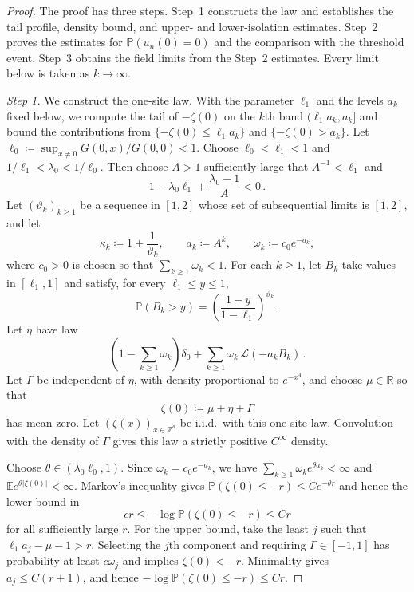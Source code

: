 \documentclass[11pt]{amsart}
\theoremstyle{plain}
\theoremstyle{definition}
\newcommand{\Z}{\mathbb{Z}}
\newcommand{\R}{\mathbb{R}}
\newcommand{\E}{\mathbb{E}}
\renewcommand{\P}{\mathbb{P}}
\begin{document}
\begin{proof}
	The proof has three steps. Step~1 constructs the law and establishes the tail profile,
	density bound, and upper- and lower-isolation estimates. Step~2 proves the estimates
	for $\P(u_n(0)=0)$ and the comparison with the threshold event. Step~3 obtains the field limits from the Step~2
	estimates. Every limit below is taken as $k\to\infty$.

	\par\smallskip\noindent\emph{Step 1.} We construct the one-site law. With the parameter
	$\ell_{1}$ and the levels $a_k$ fixed below, we compute the tail of $-\zeta(0)$ on the $k$th
	band $(\ell_{1} a_k,a_k]$ and bound the contributions from $\{-\zeta(0)\leq\ell_{1} a_k\}$ and
	$\{-\zeta(0)>a_k\}$.
	Let
	$\ell_{0}\coloneqq\sup_{x\ne0}G(0,x)/G(0,0)<1$.
	Choose $\ell_{0}<\ell_{1}<1$ and
	$1/\ell_{1}<\lambda_{0}<1/\ell_{0}$. Then choose $A>1$ sufficiently large that
	$A^{-1}<\ell_{1}$ and
	\begin{equation}\label{eq:dgt4-band-parameters}
		1-\lambda_{0}\ell_{1}+\frac{\lambda_{0}-1}{A}<0\, .
	\end{equation}
	Let $(\vartheta_k)_{k\geq1}$ be a sequence in $[1,2]$ whose set of
	subsequential limits is $[1,2]$, and let
	\[
		\kappa_k\coloneqq1+\frac1{\vartheta_k},
		\qquad
		a_k\coloneqq A^k,
		\qquad
		\omega_k\coloneqq c_{0}e^{-a_k},
	\]
	where $c_{0}>0$ is chosen so that $\sum_{k\geq1}\omega_k<1$.
	For each $k\geq1$, let $B_k$ take values in $[\ell_{1},1]$ and satisfy, for every $\ell_{1}\leq y\leq1$,
	\begin{equation}\label{eq:dgt4-band-tail}
		\P(B_k>y)
		=
		\left(\frac{1-y}{1-\ell_{1}}\right)^{\vartheta_k}\, .
	\end{equation}
	Let $\eta$ have law
	\[
		\left(1-\sum_{k\geq1}\omega_k\right)\delta_0
		+\sum_{k\geq1}\omega_k\,\mathcal L(-a_kB_k)\, .
	\]
	Let $\Gamma$ be independent of $\eta$, with density proportional to
	$e^{-x^4}$, and choose $\mu\in\R$ so that
	\begin{equation}\label{eq:dgt4-band-law}
		\zeta(0)\coloneqq\mu+\eta+\Gamma
	\end{equation}
	has mean zero. Let $(\zeta(x))_{x\in\Z^d}$ be i.i.d.\ with this one-site
	law. Convolution with the density of $\Gamma$ gives this law a strictly
	positive $C^\infty$ density.

	Choose $\theta\in(\lambda_{0}\ell_{0},1)$. Since
	$\omega_k=c_{0}e^{-a_k}$, we have
	$\sum_{k\geq1}\omega_ke^{\theta a_k}<\infty$ and
	$\E e^{\theta|\zeta(0)|}<\infty$. Markov's inequality gives
	$\P(\zeta(0)\leq-r)\leq Ce^{-\theta r}$ and hence the lower bound in
	\begin{equation}\label{eq:dgt4-band-tail-order}
		cr\leq-\log\P(\zeta(0)\leq-r)\leq Cr
	\end{equation}
	for all sufficiently large $r$. For the upper bound, take the least
	$j$ such that $\ell_{1} a_j-\mu-1>r$. Selecting the $j$th component and
	requiring $\Gamma\in[-1,1]$ has probability at least $c\omega_j$ and
	implies $\zeta(0)<-r$. Minimality gives $a_j\leq C(r+1)$, and hence
	$-\log\P(\zeta(0)\leq-r)\leq Cr$.


\end{proof}
\end{document}
